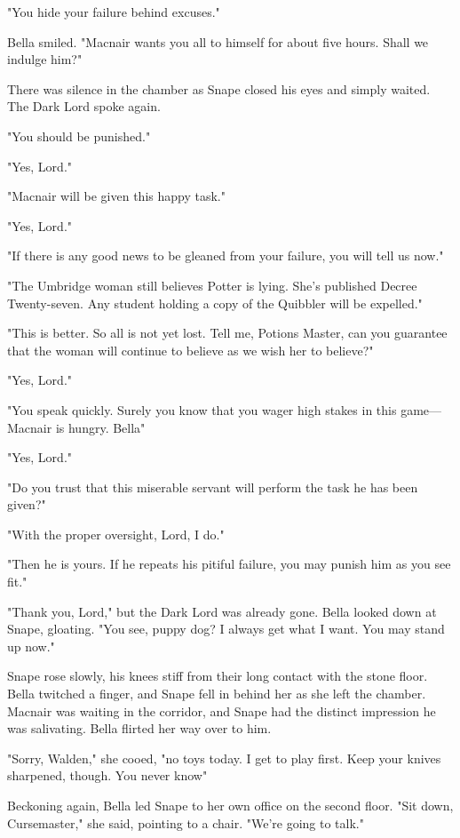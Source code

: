 "You hide your failure behind excuses."

Bella smiled. "Macnair wants you all to himself for about five hours. Shall we indulge him?"

There was silence in the chamber as Snape closed his eyes and simply waited. The Dark Lord spoke again.

"You should be punished."

"Yes, Lord."

"Macnair will be given this happy task."

"Yes, Lord."

"If there is any good news to be gleaned from your failure, you will tell us now."

"The Umbridge woman still believes Potter is lying. She's published Decree Twenty-seven. Any student holding a copy of the Quibbler will be expelled."

"This is better. So all is not yet lost. Tell me, Potions Master, can you guarantee that the woman will continue to believe as we wish her to believe?"

"Yes, Lord."

"You speak quickly. Surely you know that you wager high stakes in this game—Macnair is hungry. Bella{\el}"

"Yes, Lord."

"Do you trust that this miserable servant will perform the task he has been given?"

"With the proper oversight, Lord, I do."

"Then he is yours. If he repeats his pitiful failure, you may punish him as you see fit."

"Thank you, Lord," but the Dark Lord was already gone. Bella looked down at Snape, gloating. "You see, puppy dog? I always get what I want. You may stand up now."

Snape rose slowly, his knees stiff from their long contact with the stone floor. Bella twitched a finger, and Snape fell in behind her as she left the chamber. Macnair was waiting in the corridor, and Snape had the distinct impression he was salivating. Bella flirted her way over to him.

"Sorry, Walden," she cooed, "no toys today. I get to play first. Keep your knives sharpened, though. You never know{\el}"

Beckoning again, Bella led Snape to her own office on the second floor. "Sit down, Cursemaster," she said, pointing to a chair. "We're going to talk."

